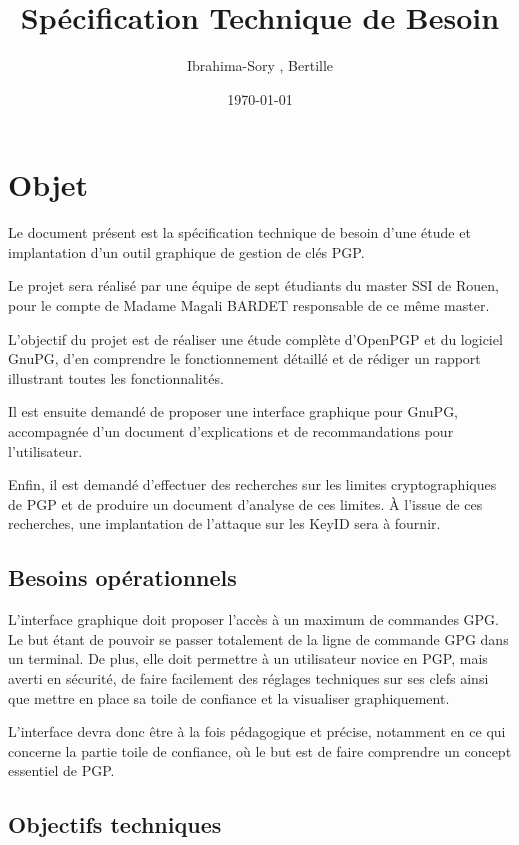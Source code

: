 \documentclass{../res/univ-projet}
\title{Spécification Technique de Besoin}
\author{Ibrahima-Sory \bsc{Barry}, Bertille \bsc{Bouillie}}
\date{\today}
\begin{document}
\maketitle
\newpage
\tableofcontents
\newpage

\section{Objet}

Le document présent est la spécification technique de besoin d'une étude et implantation d'un outil graphique de gestion de clés PGP.

Le projet sera réalisé par une équipe de sept étudiants du master SSI de Rouen, pour le compte de Madame Magali BARDET responsable de ce même master. 

L'objectif du projet est de réaliser une étude complète d'OpenPGP et du logiciel GnuPG, d'en comprendre le fonctionnement détaillé et de rédiger un rapport illustrant toutes les fonctionnalités.

Il est ensuite demandé de proposer une interface graphique pour GnuPG, accompagnée d'un document d'explications et de recommandations pour l'utilisateur.

Enfin, il est demandé d'effectuer des recherches sur les limites cryptographiques de PGP et de produire un document d'analyse de ces limites. \`{A} l'issue de ces recherches, une implantation de l'attaque sur les KeyID sera à fournir.

\subsection{Besoins opérationnels}
L'interface graphique doit proposer l'accès à un maximum de commandes GPG. Le but étant de pouvoir se passer totalement de la ligne de commande GPG dans un terminal. De plus, elle doit permettre à un utilisateur novice en PGP, mais averti en sécurité, de faire facilement des réglages techniques sur ses clefs ainsi que mettre en place sa toile de confiance et la visualiser graphiquement.

L'interface devra donc être à la fois pédagogique et précise, notamment en ce qui concerne la partie toile de confiance, où le but est de faire comprendre un concept essentiel de PGP.

\subsection{Objectifs techniques}
\end{document}

